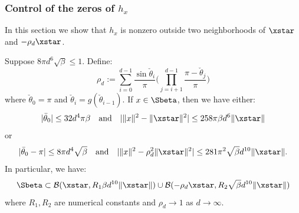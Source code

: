 \subsubsection{Control  of the zeros of $h_x$}

In this section we show that $h_x$ is nonzero outside two 
neighborhoods of $\xstar$ and $-\rho_d \xstar$.

\begin{lemma}\label{lemma:Sbeta_red}
	Suppose $8 \pi d^6 \sqrt{\beta} \leq 1$. Define:
	\[
	\rho_d := \sum_{i=0}^{d-1} \frac{\sin \check{\theta}_i }{\pi}   \big(\prod_{j=i+1}^{d-1} \frac{\pi - \check{\theta}_j}{\pi} \big)
	\]
	where $\check{\theta}_0 = \pi$ and $\check{\theta}_i = g(\check{\theta}_{i-1})$. If $x \in \Sbeta$, 
	then we have either:
	\[
	|\bar{\theta}_0| \leq 32 d^4 \pi \beta \quad \text{and} \quad |\|x\|^2 - \|\xstar\|^2 | \leq 258 \pi  \beta d^6 \|\xstar\|
	\]
	or
	\[
	|\bar{\theta}_0 - \pi| \leq 8 \pi d^4 \sqrt{\beta} \quad \text{and} \quad |\|x\|^2 - \rho_d^2 \|\xstar\|^2 | \leq 281 \pi^2 \sqrt{\beta} d^{10} \|\xstar\|.
	\]
	In particular, we have:
	\[
	\Sbeta \subset \mathcal{B}(\xstar, R_1  \beta d^{10} \|\xstar\|) \cup  \mathcal{B}(-\rho_d \xstar, R_2 \sqrt{\beta} d^{10} \|\xstar\|) 
	\]
	where $R_1, R_2$ are numerical constants and $\rho_d \to 1$ as $d \to \infty$.
\end{lemma}

